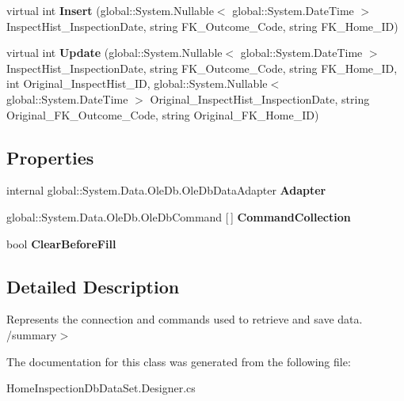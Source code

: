 \begin{DoxyCompactItemize}
\item 
\mbox{\label{class_a_f_h___scheduler_1_1_home_inspection_db_data_set_table_adapters_1_1_inspection___history_table_adapter_a6df0bc339eb01e4a65939ada679b17ee}} 
virtual int {\bfseries Insert} (global\+::\+System.\+Nullable$<$ global\+::\+System.\+Date\+Time $>$ Inspect\+Hist\+\_\+\+Inspection\+Date, string F\+K\+\_\+\+Outcome\+\_\+\+Code, string F\+K\+\_\+\+Home\+\_\+\+ID)
\item 
\mbox{\label{class_a_f_h___scheduler_1_1_home_inspection_db_data_set_table_adapters_1_1_inspection___history_table_adapter_a68f36ac0e3e7e8e9d0dc38c4e2db12d2}} 
virtual int {\bfseries Update} (global\+::\+System.\+Nullable$<$ global\+::\+System.\+Date\+Time $>$ Inspect\+Hist\+\_\+\+Inspection\+Date, string F\+K\+\_\+\+Outcome\+\_\+\+Code, string F\+K\+\_\+\+Home\+\_\+\+ID, int Original\+\_\+\+Inspect\+Hist\+\_\+\+ID, global\+::\+System.\+Nullable$<$ global\+::\+System.\+Date\+Time $>$ Original\+\_\+\+Inspect\+Hist\+\_\+\+Inspection\+Date, string Original\+\_\+\+F\+K\+\_\+\+Outcome\+\_\+\+Code, string Original\+\_\+\+F\+K\+\_\+\+Home\+\_\+\+ID)
\end{DoxyCompactItemize}
\subsection*{Properties}
\begin{DoxyCompactItemize}
\item 
\mbox{\label{class_a_f_h___scheduler_1_1_home_inspection_db_data_set_table_adapters_1_1_inspection___history_table_adapter_a55ecf0fed09e52c3b0462de436aa5361}} 
internal global\+::\+System.\+Data.\+Ole\+Db.\+Ole\+Db\+Data\+Adapter {\bfseries Adapter}\hspace{0.3cm}{\ttfamily  [get]}
\item 
\mbox{\label{class_a_f_h___scheduler_1_1_home_inspection_db_data_set_table_adapters_1_1_inspection___history_table_adapter_a745351fff12b3bfe26d774eceae46637}} 
global\+::\+System.\+Data.\+Ole\+Db.\+Ole\+Db\+Command [$\,$] {\bfseries Command\+Collection}\hspace{0.3cm}{\ttfamily  [get]}
\item 
\mbox{\label{class_a_f_h___scheduler_1_1_home_inspection_db_data_set_table_adapters_1_1_inspection___history_table_adapter_aacaa45988db85a2865fd0301d38310fd}} 
bool {\bfseries Clear\+Before\+Fill}\hspace{0.3cm}{\ttfamily  [get, set]}
\end{DoxyCompactItemize}


\subsection{Detailed Description}
Represents the connection and commands used to retrieve and save data. /summary$>$ 

The documentation for this class was generated from the following file\+:\begin{DoxyCompactItemize}
\item 
Home\+Inspection\+Db\+Data\+Set.\+Designer.\+cs\end{DoxyCompactItemize}
